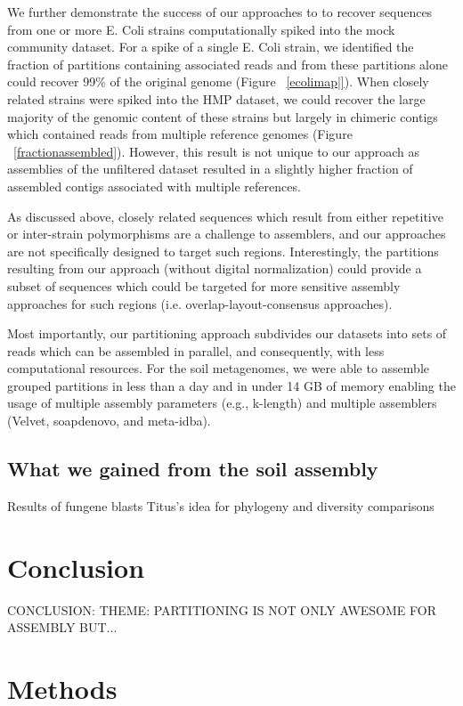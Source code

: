 \documentclass[11pt]{article} %
\begin{document}
We further demonstrate the success of our approaches to to recover sequences from one or more E. Coli strains computationally spiked into the mock community dataset.  For a spike of a single E. Coli strain, we identified the fraction of partitions containing associated reads and from these partitions alone could recover 99\% of the original genome (Figure ~\ref{ecolimap|}).  When closely related strains were spiked into the HMP dataset, we could recover the large majority of the genomic content of these strains but largely in chimeric contigs which contained reads from multiple reference genomes (Figure ~\ref{fractionassembled}).  However, this result is not unique to our approach as assemblies of the unfiltered dataset resulted in a slightly higher fraction of assembled contigs associated with multiple references. 

As discussed above, closely related sequences which result from either repetitive or inter-strain polymorphisms are a challenge to assemblers, and our approaches are not specifically designed to target such regions.  Interestingly, the partitions resulting from our approach (without digital normalization) could provide a subset of sequences which could be targeted for more sensitive assembly approaches for such regions (i.e. overlap-layout-consensus approaches).  

Most importantly, our partitioning approach subdivides our datasets into sets of reads which can be assembled in parallel, and consequently, with less computational resources.  For the soil metagenomes, we were able to assemble grouped partitions in less than a day and in under 14 GB of memory enabling the usage of multiple assembly parameters (e.g., k-length) and multiple assemblers (Velvet, soapdenovo, and meta-idba).

\subsection{What we gained from the soil assembly}

Results of fungene blasts
Titus's idea for phylogeny and diversity comparisons

\section{Conclusion}
CONCLUSION:  
THEME: PARTITIONING IS NOT ONLY AWESOME FOR ASSEMBLY BUT...

\section{Methods}
\end{document}
